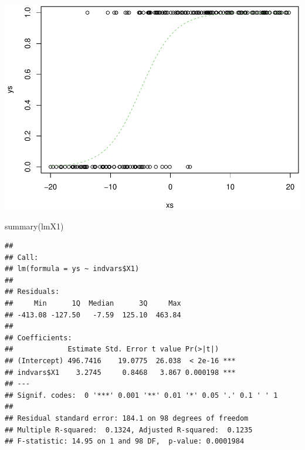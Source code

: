 \documentclass[
]{book}
\newenvironment{Shaded}{\begin{snugshade}}{\end{snugshade}}
\newcommand{\FunctionTok}[1]{\textcolor[rgb]{0.00,0.00,0.00}{#1}}
\newcommand{\NormalTok}[1]{#1}
\newcommand{\OtherTok}[1]{\textcolor[rgb]{0.56,0.35,0.01}{#1}}
\newcommand{\SpecialCharTok}[1]{\textcolor[rgb]{0.00,0.00,0.00}{#1}}
\begin{document}
\includegraphics{ECOMODbook_files/figure-latex/unnamed-chunk-15-1.pdf}

\begin{Shaded}
\begin{Highlighting}[]
\FunctionTok{summary}\NormalTok{(lmX1)}
\end{Highlighting}
\end{Shaded}

\begin{verbatim}
## 
## Call:
## lm(formula = ys ~ indvars$X1)
## 
## Residuals:
##     Min      1Q  Median      3Q     Max 
## -413.08 -127.50   -7.59  125.10  463.84 
## 
## Coefficients:
##             Estimate Std. Error t value Pr(>|t|)    
## (Intercept) 496.7416    19.0775  26.038  < 2e-16 ***
## indvars$X1    3.2745     0.8468   3.867 0.000198 ***
## ---
## Signif. codes:  0 '***' 0.001 '**' 0.01 '*' 0.05 '.' 0.1 ' ' 1
## 
## Residual standard error: 184.1 on 98 degrees of freedom
## Multiple R-squared:  0.1324, Adjusted R-squared:  0.1235 
## F-statistic: 14.95 on 1 and 98 DF,  p-value: 0.0001984
\end{verbatim}

\begin{Shaded}
\end{Shaded}
\end{document}
